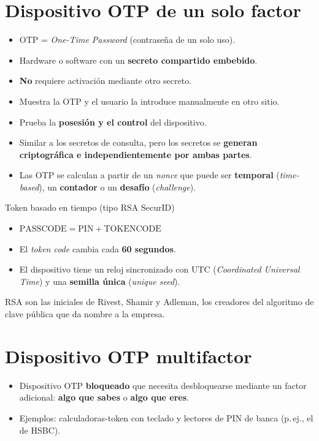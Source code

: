 \documentclass[11pt,a4paper]{report}
\begin{document}
\section{Dispositivo OTP de un solo factor}
 
\begin{itemize}
  \item OTP = \emph{One-Time Password} (contraseña de un solo uso).
  \item Hardware o software con un \textbf{secreto compartido embebido}.
  \item \textbf{No} requiere activación mediante otro secreto.
  \item Muestra la OTP y el usuario la introduce manualmente en otro sitio.
  \item Prueba la \textbf{posesión y el control} del dispositivo.
  \item Similar a los secretos de consulta, pero los secretos se \textbf{generan criptográfica e independientemente por ambas partes}.
  \item Las OTP se calculan a partir de un \emph{nonce} que puede ser \textbf{temporal} (\emph{time-based}), un \textbf{contador} o un \textbf{desafío} (\emph{challenge}).
\end{itemize}
 
\begin{ejemplo}{Token basado en tiempo (tipo RSA SecurID)}
\begin{itemize}
  \item $\text{PASSCODE} = \text{PIN} + \text{TOKENCODE}$
  \item El \emph{token code} cambia cada \textbf{60 segundos}.
  \item El dispositivo tiene un reloj sincronizado con UTC (\emph{Coordinated Universal Time}) y una \textbf{semilla única} (\emph{unique seed}).
\end{itemize}
RSA son las iniciales de Rivest, Shamir y Adleman, los creadores del algoritmo de clave pública que da nombre a la empresa.
\end{ejemplo}
 
\section{Dispositivo OTP multifactor}
 
\begin{itemize}
  \item Dispositivo OTP \textbf{bloqueado} que necesita desbloquearse mediante un factor adicional: \textbf{algo que sabes} o \textbf{algo que eres}.
  \item Ejemplos: calculadoras-token con teclado y lectores de PIN de banca (p.\,ej., el de HSBC).
\end{itemize}
 
\end{document}

